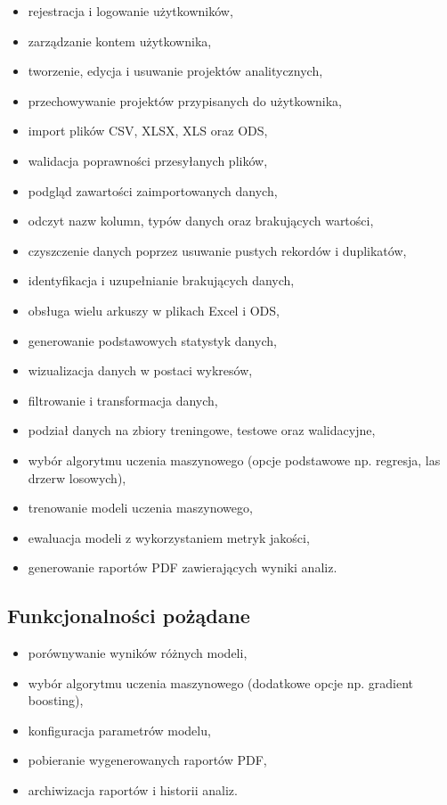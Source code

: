 \documentclass[12pt]{book}
\begin{document}
\begin{itemize}
\item rejestracja i logowanie użytkowników,
\item zarządzanie kontem użytkownika,
\item tworzenie, edycja i usuwanie projektów analitycznych,
\item przechowywanie projektów przypisanych do użytkownika,
\item import plików CSV, XLSX, XLS oraz ODS,
\item walidacja poprawności przesyłanych plików,
\item podgląd zawartości zaimportowanych danych,
\item odczyt nazw kolumn, typów danych oraz brakujących wartości,
\item czyszczenie danych poprzez usuwanie pustych rekordów i duplikatów,
\item identyfikacja i uzupełnianie brakujących danych,
\item obsługa wielu arkuszy w plikach Excel i ODS,
\item generowanie podstawowych statystyk danych,
\item wizualizacja danych w postaci wykresów,
\item filtrowanie i transformacja danych,
\item podział danych na zbiory treningowe, testowe oraz walidacyjne,
\item wybór algorytmu uczenia maszynowego (opcje podstawowe np. regresja, las drzerw losowych),
\item trenowanie modeli uczenia maszynowego,
\item ewaluacja modeli z wykorzystaniem metryk jakości,
\item generowanie raportów PDF zawierających wyniki analiz.
\end{itemize}

\subsection{Funkcjonalności pożądane}

\begin{itemize}
\item porównywanie wyników różnych modeli,
\item wybór algorytmu uczenia maszynowego (dodatkowe opcje np. gradient boosting),
\item konfiguracja parametrów modelu,
\item pobieranie wygenerowanych raportów PDF,
\item archiwizacja raportów i historii analiz.
\end{itemize}
\end{document}
